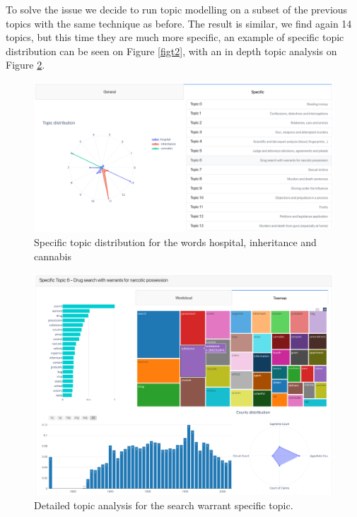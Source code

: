 To solve the issue we decide to run topic modelling on a subset of the previous 
topics with the same technique as before. The result is similar, we find again 14 topics, 
but this time they are much more specific, an example of specific topic distribution can 
be seen on Figure \vref{figt2}, with an in depth topic analysis on Figure \ref{figt3}.
\begin{figure}
  \begin{center}
    \includegraphics[width=\textwidth]{images/topic2.png}
    \caption{Specific topic distribution for the words hospital, inheritance and cannabis} \label{figt2}
  \end{center}
\end{figure}
\begin{figure}
  \begin{center}
    \includegraphics[width=\textwidth]{images/topic3.png}
    \caption{Detailed topic analysis for the search warrant specific topic.} \label{figt3}
  \end{center}
\end{figure}

